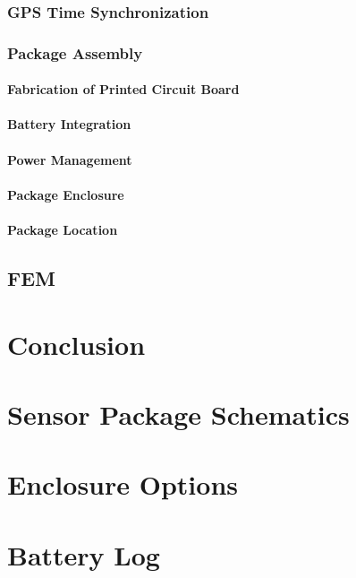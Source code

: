 \documentclass[12pt]{report}
\begin{document}
		\subsection{GPS Time Synchronization}
			
		\subsection{Package Assembly}
			\subsubsection{Fabrication of Printed Circuit Board}
				
			\subsubsection{Battery Integration}
			\subsubsection{Power Management}
			\subsubsection{Package Enclosure}
				
			\subsubsection{Package Location}
				
	\section{FEM}
		
		
\chapter{Conclusion}
\label{ch:Collection}
	




\appendix

\chapter{Sensor Package Schematics}
\label{app:Schematic}


\chapter{Enclosure Options}
\label{app:CaseOptions}


\chapter{Battery Log}
\label{app:batterylog}

 
\end{document}
